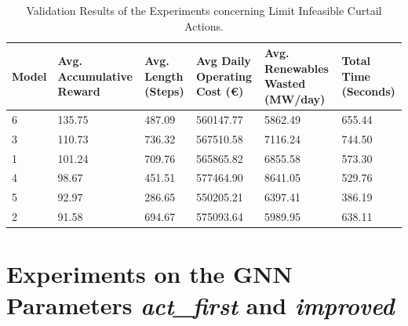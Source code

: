 \begin{table}[ht]
	\centering
	\begin{tabularx}{\textwidth}{|l|X|X|X|X|X|}
		\hline
		\textbf{Model} & \textbf{Avg. Accumulative Reward}& \textbf{Avg. Length (Steps)} & \textbf{Avg Daily Operating Cost (€)} & \textbf{Avg. Renewables Wasted (MW/day)} & \textbf{Total Time (Seconds)}\\
		\hline
		6 & 135.75 & 487.09 & 560147.77 & 5862.49 & 655.44 \\
		3 & 110.73 & 736.32 & 567510.58 & 7116.24 & 744.50 \\
		1 & 101.24 & 709.76 & 565865.82 & 6855.58 & 573.30 \\
		4 & 98.67 & 451.51 & 577464.90 & 8641.05 & 529.76 \\
		5 & 92.97 & 286.65 & 550205.21 & 6397.41 & 386.19 \\
		2 & 91.58 & 694.67 & 575093.64 & 5989.95 & 638.11 \\
		\hline
	\end{tabularx}
	\caption{Validation Results of the Experiments concerning Limit Infeasible Curtail Actions.}
	\label{fig:curtail-val}
\end{table}

\section{Experiments on the \ac{GNN} Parameters \textit{act\_first} and \textit{improved}}

